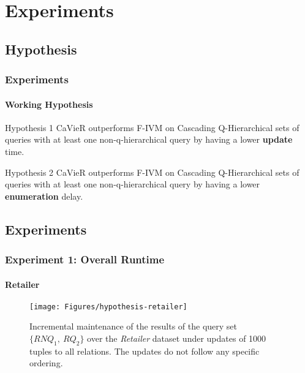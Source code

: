 \documentclass[
	11pt, %
]{beamer}
\begin{document}
\section{Experiments}
\subsection{Hypothesis}
\begin{frame}
	\frametitle{Experiments}
	\framesubtitle{Working Hypothesis}
	\begin{block}{Hypothesis 1 }\label{hyp:initialUpdate}
		CaVieR outperforms F-IVM on Cascading Q-Hierarchical sets of queries with at least one non-q-hierarchical query by having a lower \textbf{update} time.
	\end{block}
	
	\begin{block}{Hypothesis 2}\label{hyp:initialEnumeration}
		CaVieR outperforms F-IVM on Cascading Q-Hierarchical sets of queries with at least one non-q-hierarchical query by having a lower \textbf{enumeration} delay.
	\end{block}

\end{frame}


\subsection{Experiments}
\begin{frame}
	\frametitle{Experiment 1: Overall Runtime}
	\framesubtitle{Retailer}
	\begin{figure}
		\begin{minipage}{0.25\textwidth}
		\end{minipage}
		\begin{minipage}{0.74\textwidth}
			\texttt{[image: Figures/hypothesis-retailer]} %
		\end{minipage}
		\caption{Incremental maintenance of the results of the query set $\{RNQ_1,\ RQ_2\}$ over the {\em Retailer} dataset under updates of 1000 tuples to all relations. The updates do not follow any specific ordering. }
	\end{figure}
\end{frame}
\end{document}
